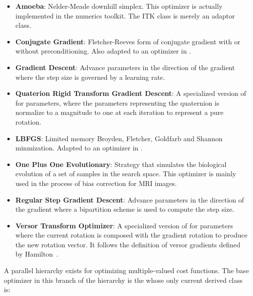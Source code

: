 \begin{itemize}

\item \textbf{Amoeba}: Nelder-Meade downhill simplex.  This optimizer is
actually implemented in the  numerics toolkit.  The ITK class
 is merely an adaptor class.

\item \textbf{Conjugate Gradient}: Fletcher-Reeves form 
of conjugate gradient with or without preconditioning. Also adapted to an
optimizer in .

\item \textbf{Gradient Descent}: Advance parameters in the direction of the
gradient where the step size is governed by a learning rate. 

\item \textbf{Quaterion Rigid Transform Gradient Descent}: 
A specialized version of  for
 parameters, where the parameters representing
the quaternion is normalize to a magnitude to one at each iteration to
represent a pure rotation.

\item \textbf{LBFGS}: Limited memory Broyden, Fletcher, Goldfarb
and Shannon minmization. Adapted to an optimizer in .

\item \textbf{One Plus One Evolutionary}: Strategy that simulates the
biological evolution of a set of samples in the search space. This optimizer
is mainly used in the process of bias correction for MRI images.

\item \textbf{Regular Step Gradient Descent}: Advance parameters in the
direction of the gradient where a bipartition scheme is used to compute
the step size. 

\item \textbf{Versor Transform Optimizer}: A specialized version of
 for 
parameters  where the current rotation is composed with the gradient rotation
to produce the new rotation vector. It follows the definition of versor
gradients defined by Hamilton~\cite{Hamilton1866}.

\end{itemize}

A parallel hierarchy exists for optimizing multiple-valued cost functions. The
base optimizer in this branch of the hierarchy is the
 whose only current derived class
is:

